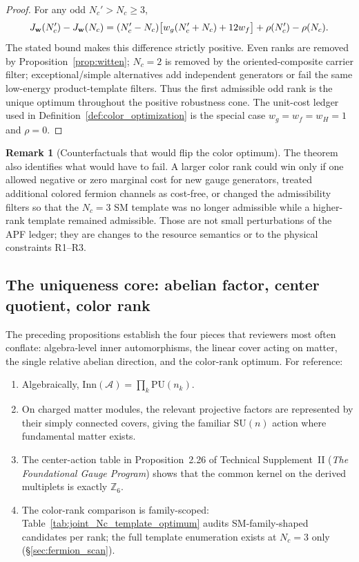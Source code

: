 \documentclass[11pt]{article}
\theoremstyle{definition}
\newtheorem{remark}[theorem]{Remark}
\newcommand{\SU}{\mathrm{SU}}
\newcommand{\TSII}{Technical Supplement~II (\emph{The Foundational Gauge Program})}
\begin{document}
\begin{proof}
For any odd $N_c'>N_c\ge3$,
\begin{equation}
  J_{\bf w}(N_c')-J_{\bf w}(N_c)
  =(N_c'-N_c)\bigl[w_g(N_c'+N_c)+12w_f\bigr]
  +\rho(N_c')-\rho(N_c).
\end{equation}
The stated bound makes this difference strictly positive.  Even ranks are
removed by Proposition~\ref{prop:witten}; $N_c=2$ is removed by the
oriented-composite carrier filter; exceptional/simple alternatives add
independent generators or fail the same low-energy product-template filters.
Thus the first admissible odd rank is the unique optimum throughout the
positive robustness cone.  The unit-cost ledger used in
Definition~\ref{def:color_optimization} is the special case
$w_g=w_f=w_H=1$ and $\rho=0$.
\end{proof}

\begin{remark}[Counterfactuals that would flip the color optimum]
The theorem also identifies what would have to fail.  A larger color rank
could win only if one allowed negative or zero marginal cost for new gauge
generators, treated additional colored fermion channels as cost-free, or
changed the admissibility filters so that the $N_c=3$ SM template was no
longer admissible while a higher-rank template remained admissible.  Those are
not small perturbations of the APF ledger; they are changes to the resource
semantics or to the physical constraints R1--R3.
\end{remark}

\subsection{The uniqueness core: abelian factor, center quotient, color rank}
\label{sec:uniqueness_core_v33}

The preceding propositions establish the four pieces that reviewers most
often conflate: algebra-level inner automorphisms, the linear cover acting
on matter, the single relative abelian direction, and the color-rank optimum.
For reference:
\begin{enumerate}[label=\textbf{U\arabic*},nosep]
  \item Algebraically, $\mathrm{Inn}(\mathcal A)=\prod_k\mathrm{PU}(n_k)$.
  \item On charged matter modules, the relevant projective factors are
  represented by their simply connected covers, giving the familiar
  $\SU(n)$ action where fundamental matter exists.
  \item The center-action table in Proposition~2.26 of \TSII{} shows
  that the common kernel on the derived multiplets is exactly $\mathbb Z_6$.
  \item The color-rank comparison is family-scoped:
  Table~\ref{tab:joint_Nc_template_optimum} audits SM-family-shaped
  candidates per rank; the full template enumeration exists at
  $N_c = 3$ only (\S\ref{sec:fermion_scan}).
\end{enumerate}
\end{document}
